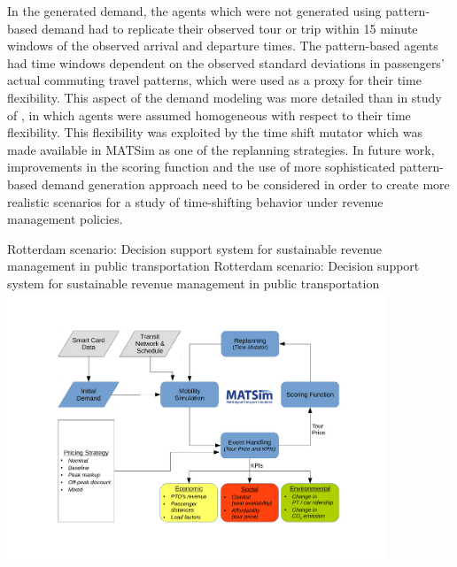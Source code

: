 In the generated demand, the agents which were not generated using pattern-based demand had to replicate their observed tour or trip within 15 minute windows of the observed arrival and departure times. The pattern-based agents had time windows dependent on the observed standard deviations in passengers' actual commuting travel patterns, which were used as a proxy for their time flexibility. This aspect of the demand modeling was more detailed than in study of \citet[][]{LovricEtAl_DSS_2013}, in which agents were assumed homogeneous with respect to their time flexibility. This flexibility was exploited by the time shift mutator which was made available in MATSim as one of the replanning strategies. In future work, improvements in the scoring function and the use of more sophisticated pattern-based demand generation approach need to be considered in order to create more realistic scenarios for a study of time-shifting behavior under revenue management policies.

\createfigure%
{Rotterdam scenario: Decision support system for sustainable revenue management in public transportation}%
{Rotterdam scenario: Decision support system for sustainable revenue management in public transportation}%
{\label{fig:rotterdam}}%
{\includegraphics[width=0.85\textwidth, angle=0]{./using/figures/rotterdam}}%
{}


